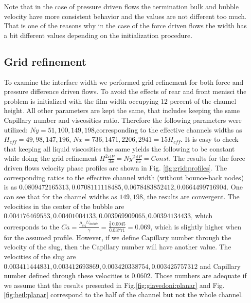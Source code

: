 \documentclass{article}
\begin{document}
Note that in the case of pressure driven flows the termination bulk and bubble
velocity have more consistent behavior and the values are not different too
much. That is one of the reasons why in the case of the force driven flows the
width has a bit different values depending on the initialization procedure. 


\subsection{Grid refinement}
To examine the interface width we performed grid refinement for both force and
pressure difference driven flows. To avoid the effects of rear and front
menisci the problem is initialized with the film width occupying $12$ percent
of the channel height. All other parameters are kept the same, that includes
keeping the same Capillary number and viscosities ratio. Therefore the
following parameters were utilized: $Ny=51,100,149,198$,corresponding to the
effective channels widths as $H_{eff}=49,98,147,196$, $Nx=736,1471,2206,2941=15
H_{eff}$. It is easy to check
that keeping all liquid viscosities the same yields the following to be
constant while doing the grid refinement
$H^2\frac{\mathrm{d}P}{\mathrm{d}x}=Ny^2\frac{\mathrm{d}P}{\mathrm{d}x}=Const$.
The results for the force driven flows velocity phase profiles are shown in
Fig. \ref{fig:grid:profiles}. The corresponding ratios to the effective channel
width (without bounce-back nodes) is as $0.0809472165313,
0.0708111118485, 0.0678483852412, 0.0664499716904$. One can see
that for the channel widths as $149,198$, the results are convergent. The
velocities in the center of the bubble are $0.004176469553,
0.00401004133, 0.003969909065, 0.00394134433$, which corresponds
to the $Ca=\frac{\mu_{liq} U_{bubble}}{\gamma}=\frac{\frac{2}{3}\,
0.0045}{0.03771}=0.069$, which is slightly higher when for the assumed
profile. However, if we define Capillary number through the velocity of the
slug, then the Capillary number will have another value. The velocities of the
slug are $0.003411444831,0.003412693869,0.003420338754,0.003425757312$ and
Capillary number defined through these velocities is $0.0602$. Those numbers
are adequate if we assume that the results presented in
Fig.\ref{fig:giavedoni:planar} and Fig. \ref{fig:heil:planar} correspond to the
half of the channel but not the whole channel. 
\end{document}
